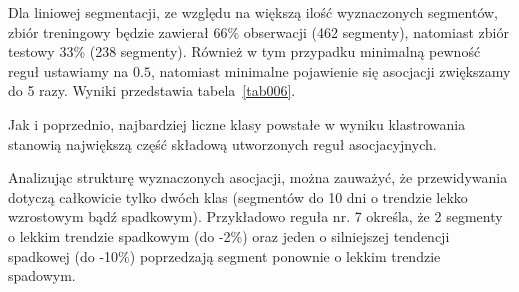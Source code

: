 \documentclass[polish, twoside, 12pt, a4paper]{article}
\theoremstyle{definition}
\theoremstyle{plain}
\theoremstyle{remark}
\begin{document}
Dla liniowej segmentacji, ze względu na większą ilość wyznaczonych segmentów, zbiór treningowy będzie zawierał 66\% obserwacji (462 segmenty), natomiast zbiór testowy 
33\% (238 segmenty). Również w tym przypadku minimalną pewność reguł ustawiamy na \(0.5\), natomiast minimalne pojawienie się asocjacji zwiększamy do 5 razy. Wyniki 
przedstawia tabela~\ref{tab006}. 

Jak i poprzednio, najbardziej liczne klasy powstałe w wyniku klastrowania stanowią największą część składową utworzonych reguł asocjacyjnych.

Analizując strukturę wyznaczonych asocjacji, można zauważyć, że przewidywania dotyczą całkowicie tylko dwóch klas (segmentów do 10 dni o trendzie lekko wzrostowym bądź spadkowym). 
Przykładowo reguła nr. 7 określa, że 2 segmenty o lekkim trendzie spadkowym (do -2\%) oraz jeden o silniejszej tendencji spadkowej (do -10\%) poprzedzają segment ponownie 
o lekkim trendzie spadowym.
\end{document}
